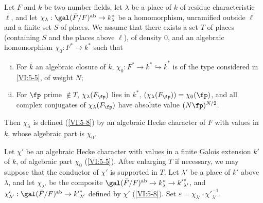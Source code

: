 \begin{theorem_}\label{VI:5-10}
Let $F$ and $k$ be two number fields, let $\lambda$ be a place of $k$ of 
residue characteristic $\ell$, and let 
$\chi_\lambda:\gal(\bar F/F)^\textnormal{ab}\to k_\lambda^\ast$ be a 
homomorphism, unramified outside $\ell$ and a finite set $S$ of 
places. We assume that there exists a set $T$ of places (containing $S$ and the 
places above $\ell$), of density $0$, and an algebraic homomorphism 
$\chi_0:F^\ast \to k^\ast$ such that 
\begin{enumerate}[(i)]
  \item For $\bar k$ an algebraic closure of $k$, 
    $\chi_0:F^\ast \to k^\ast \hookrightarrow \bar k^\ast$ is of the type 
    considered in \ref{VI:5-5}, of weight $N$; 
\item For $\fp$ prime $\notin T$, $\chi_\lambda(F_\fp)$ lies in 
    $k^\ast$, $(\chi_\lambda(F_\fp))=\chi_0(\fp)$, and all complex conjugates 
    of $\chi_\lambda(F_\fp)$ have absolute value $(N \fp)^{N/2}$. 
\end{enumerate}

Then $\chi_\lambda$ is defined (\ref{VI:5-8}) by an algebraic Hecke character 
of $F$ with values in $k$, whose algebraic part is $\chi_0$. 
\end{theorem_}

Let $\chi'$ be an algebraic Hecke character with values in a 
finite Galois extension $k'$ of $k$, of algebraic part $\chi_0$ 
(\ref{VI:5-5}). After enlarging $T$ if necessary, we may suppose that the conductor of 
$\chi'$ is supported in $T$. Let $\lambda'$ be a place of $k'$ above 
$\lambda$, and let $\chi_{\lambda'}$ be the composite 
$\gal(\bar F/F)^\text{ab}\to k_\lambda^\ast \to {k'}_{\lambda'}^\ast$, and 
$\chi_{\lambda'}':\gal(\bar F/F)^\text{ab}\to {k'}_{\lambda'}^\ast$ defined 
by $\chi'$ (\ref{VI:5-8}). Set 
$\varepsilon = \chi_{\lambda'} \cdot {\chi'}_{\lambda'}^{-1}$.

